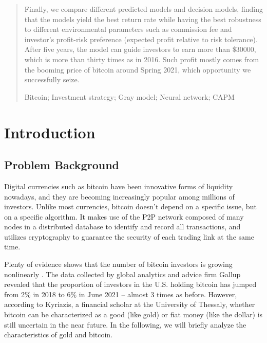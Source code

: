 \documentclass{mcmthesis}
\begin{document}
\begin{abstract}
		Finally, we compare different predicted models and decision models, finding that the models yield the best return rate while having the best robustness to different environmental parameters such as commission fee and investor's profit-risk preference (expected profit relative to risk tolerance). After five years, the model can guide investors to earn more than \$30000, which is more than thirty times as in 2016. Such profit mostly comes from the booming price of bitcoin around Spring 2021, which opportunity we successfully seize. 
		
		\begin{keywords}
			Bitcoin; Investment strategy; Gray model; Neural network; CAPM
		\end{keywords}
		
	\end{abstract}
	
	\maketitle
	\newpage
	\tableofcontents
	\newpage
	
	\section{Introduction}
	
	\subsection{Problem Background}
	
	Digital currencies such as bitcoin have been innovative forms of liquidity nowadays, and they are becoming increasingly popular among millions of investors. Unlike most currencies, bitcoin doesn't depend on a specific issue, but on a specific algorithm. It makes use of the P2P network composed of many nodes in a distributed database to identify and record all transactions, and utilizes cryptography to guarantee the security of each trading link at the same time. 
	
	Plenty of evidence shows that the number of bitcoin investors is growing nonlinearly \cite{INVESTOR}. The data collected by global analytics and advice firm Gallup revealed that the proportion of investors in the U.S. holding bitcoin has jumped from 2\% in 2018 to 6\% in June 2021 -- almost 3 times as before. However, according to Kyriazis, a financial scholar at the University of Thessaly, whether bitcoin can be characterized as a good (like gold) or fiat money (like the dollar) is still uncertain in the near future. In the following, we will briefly analyze the characteristics of gold and bitcoin. 
	
\end{document}
